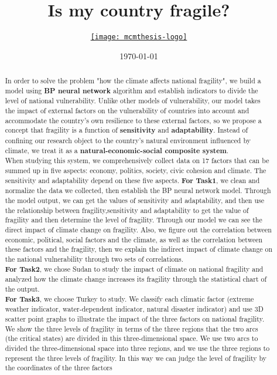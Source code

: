 \documentclass{mcmthesis}
\title{Is my country fragile?}
\author{\small \href{http://www.latexstudio.net/}
  {\texttt{[image: mcmthesis-logo]}}}
\date{\today}
\begin{document}
\begin{abstract}
  In order to solve the problem "how the climate affects national fragility", we build a model using \textbf{BP neural network} algorithm and establish indicators to divide the level of national vulnerability. Unlike other models of vulnerability, our model takes the impact of external factors on the vulnerability of countries into account  and accommodate the country's own resilience to these external factors, so we propose a concept that fragility is a function of \textbf{sensitivity} and \textbf{adaptability}. Instead of confining our research object to the country's natural environment influenced by climate, we treat it as a \textbf{natural-economic-social composite system}. \\
  When studying this system, we comprehensively collect data on 17 factors that can be summed up in five aspects: economy, politics, society, civic cohesion and climate. The sensitivity and adaptability depend on these five aspects.
  \textbf{For Task1}, we clean and normalize the data we collected, then establish the BP neural network model. Through the model output, we can get the values ​​of sensitivity and adaptability, and then use the relationship between fragility,sensitivity and adaptability to get the value of fragility and then determine the level of fragility. Through our model we can see the direct impact of climate change on fragility. Also, we figure out the correlation between economic, political, social factors and the climate, as well as the correlation between these factors and the fragility, then we explain the indirect impact of climate change on the national vulnerability through two sets of correlations.\\
  \textbf{For Task2}, we chose Sudan to study the impact of climate on national fragility and analyzed how the climate change increases its fragility through the statistical chart of the output.\\
  \textbf{For Task3}, we choose Turkey to study. We classify each climatic factor (extreme weather indicator, water-dependent indicator, natural disaster indicator) and use 3D scatter point graphs to illustrate the impact of the three factors on national fragility. We show the three levels of fragility in terms of the three regions that the two arcs (the critical states) are divided in this three-dimensional space. We use two arcs to divided the three-dimensional space into three regions, and we use the three regions to represent the three levels of fragility. In this way we can judge the level of fragility by the coordinates of the three factors\\

\end{abstract}
\end{document}
